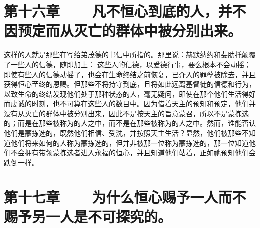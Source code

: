 
\section{第十六章——凡不恒心到底的人，并不因预定而从灭亡的群体中被分别出来。}

这样的人就是那些在写给弟茂德的书信中所指的。那里说：赫默纳约和斐肋托颠覆了一些人的信德，随即加上： 这些人的信德，以爱德行事，要么根本不会动摇；即使有些人的信德动摇了，也会在生命终结之前恢复，已介入的罪孽被除去，并且获得恒心至终的恩赐。但那些不将持守到底，且将如此远离基督徒的信德和行为，以致生命的终结发现他们处于那种状态的人，毫无疑问，即使在那个他们生活得好而虔诚的时刻，也不可算在这些人的数目中。因为借着天主的预知和预定，他们并没有从灭亡的群体中被分别出来，因此不是按天主的旨意蒙召，所以不是蒙拣选的；而是在那些被称为的人之中，而不是在那些被称为的人之中。然而，谁能否认他们是蒙拣选的，既然他们相信、受洗，并按照天主生活？显然，他们被那些不知道他们将来如何的人称为蒙拣选的，但并非被那一位称为蒙拣选的，那一位知道他们不会拥有带领蒙拣选者进入永福的恒心，并且知道他们站着，正如祂预知他们会跌倒一样。\par


\section{第十七章——为什么恒心赐予一人而不赐予另一人是不可探究的。}

